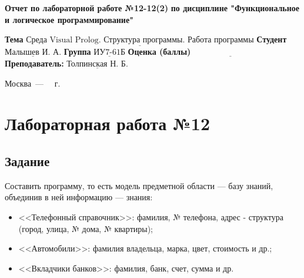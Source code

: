 \documentclass[12pt]{report}
\begin{document}
\begin{titlepage}
		
		\begin{center}
			\noindent\begin{minipage}{1.3\textwidth}\centering
				\Large\textbf{  Отчет по лабораторной работе №12-12(2)}\newline
				\textbf{по дисциплине \newline "Функциональное и логическое программирование"}\newline\newline
			\end{minipage}
		\end{center}
		
		\noindent\textbf{Тема} $\underline{\text{Среда Visual Prolog. Структура программы. Работа программы}}$\newline\newline
		\noindent\textbf{Студент} $\underline{\text{Малышев И. А.}}$\newline\newline
		\noindent\textbf{Группа} $\underline{\text{ИУ7-61Б}}$\newline\newline
		\noindent\textbf{Оценка (баллы)} $\underline{\text{~~~~~~~~~~~~~~~~~~~~~~~~~~~}}$\newline\newline
		\noindent\textbf{Преподаватель: } $\underline{\text{Толпинская Н. Б.}}$\newline\newline\newline
		
		\begin{center}
			\vfill
			Москва~---~\the\year
			~г.
		\end{center}
	\end{titlepage}
	
	
	\setcounter{page}{2}


\chapter*{Лабораторная работа №12}
\section*{Задание}
Составить программу, то есть модель предметной области — базу знаний, объединив в ней информацию — знания:

\begin{itemize}
	\item <<Телефонный справочник>>: фамилия, № телефона, адрес - структура (город, улица, № дома, № квартиры);
	\item <<Автомобили>>: фамилия владельца, марка, цвет, стоимость и др.;
	\item <<Вкладчики банков>>: фамилия, банк, счет, сумма и др.
\end{itemize}
\end{document}
